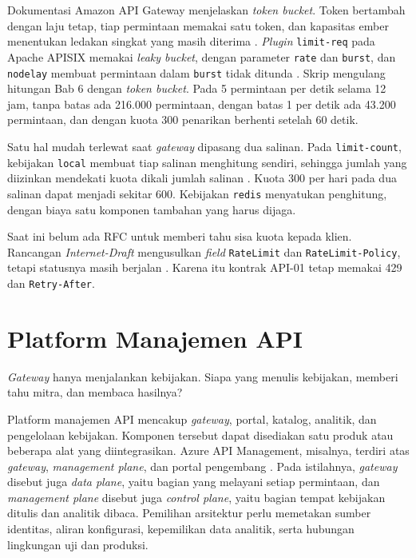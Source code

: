 \begin{pendalaman}[title={Pendalaman Teknis (opsional): Algoritma Batas Laju dan Penghitung Bersama}]
Dokumentasi Amazon API Gateway menjelaskan \textit{token bucket}. Token bertambah dengan laju tetap, tiap permintaan
memakai satu token, dan kapasitas ember menentukan ledakan singkat yang masih diterima \cite{aws-throttling}.
\textit{Plugin} \texttt{limit-req} pada Apache APISIX memakai \textit{leaky bucket}, dengan parameter \texttt{rate} dan
\texttt{burst}, dan \texttt{nodelay} membuat permintaan dalam \texttt{burst} tidak ditunda \cite{c10-apisix-limit-req}.
Skrip  mengulang hitungan Bab 6 dengan \textit{token bucket}. Pada 5
permintaan per detik selama 12 jam, tanpa batas ada 216.000 permintaan, dengan batas 1 per detik ada 43.200 permintaan,
dan dengan kuota 300 penarikan berhenti setelah 60 detik.

Satu hal mudah terlewat saat \textit{gateway} dipasang dua salinan. Pada \texttt{limit-count}, kebijakan \texttt{local}
membuat tiap salinan menghitung sendiri, sehingga jumlah yang diizinkan mendekati kuota dikali jumlah salinan
\cite{c10-apisix-limit-count}. Kuota 300 per hari pada dua salinan dapat menjadi sekitar 600. Kebijakan \texttt{redis}
menyatukan penghitung, dengan biaya satu komponen tambahan yang harus dijaga.

Saat ini belum ada RFC untuk memberi tahu sisa kuota kepada klien. Rancangan \textit{Internet-Draft} mengusulkan
\textit{field} \texttt{RateLimit} dan \texttt{RateLimit-Policy}, tetapi statusnya masih berjalan
\cite{c10-ratelimit-draft}. Karena itu kontrak API-01 tetap memakai 429 dan \texttt{Retry-After}.
\end{pendalaman}

\section{Platform Manajemen API}

\textit{Gateway} hanya menjalankan kebijakan. Siapa yang menulis kebijakan, memberi tahu mitra, dan membaca hasilnya?

Platform manajemen API mencakup \textit{gateway}, portal, katalog, analitik, dan pengelolaan kebijakan. Komponen
tersebut dapat disediakan satu produk atau beberapa alat yang diintegrasikan. Azure API Management, misalnya, terdiri
atas \textit{gateway}, \textit{management plane}, dan portal pengembang \cite{azure-apim}. Pada istilahnya,
\textit{gateway} disebut juga \textit{data plane}, yaitu bagian yang melayani setiap permintaan, dan \textit{management
plane} disebut juga \textit{control plane}, yaitu bagian tempat kebijakan ditulis dan analitik dibaca. Pemilihan
arsitektur perlu memetakan sumber identitas, aliran konfigurasi, kepemilikan data analitik, serta hubungan lingkungan
uji dan produksi.

